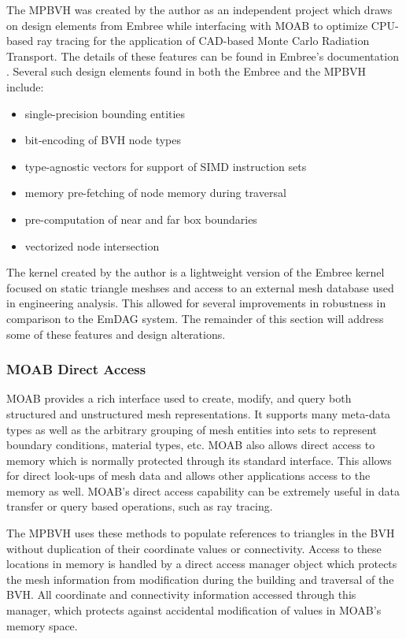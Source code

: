 The MPBVH was created by the author as an independent project which draws on
design elements from Embree while interfacing with MOAB to optimize CPU-based
ray tracing for the application of CAD-based Monte Carlo Radiation
Transport. The details of these features can be found in Embree's documentation
\cite{Embree}. Several such design elements found in both the Embree and the MPBVH
include:

 \begin{itemize} 
  \item single-precision bounding entities
  \item bit-encoding of BVH node types
  \item type-agnostic vectors for support of SIMD instruction sets
  \item memory pre-fetching of node memory during traversal
  \item pre-computation of near and far box boundaries
  \item vectorized node intersection
 \end{itemize} 


The kernel created by the author is a lightweight version of the Embree kernel
focused on static triangle meshses and access to an external mesh database used
in engineering analysis. This allowed for several improvements in robustness in
comparison to the EmDAG system. The remainder of this section will address some
of these features and design alterations.

\subsubsection{MOAB Direct Access}

MOAB provides a rich interface used to create, modify, and query both structured
and unstructured mesh representations. It supports many meta-data types as well
as the arbitrary grouping of mesh entities into sets to represent boundary
conditions, material types, etc. MOAB also allows direct access to memory which
is normally protected through its standard interface. This allows for direct
look-ups of mesh data and allows other applications access to the memory as
well. MOAB's direct access capability can be extremely useful in data transfer
or query based operations, such as ray tracing.

The MPBVH uses these methods to populate references to triangles in the BVH
without duplication of their coordinate values or connectivity. Access to these
locations in memory is handled by a direct access manager object which protects
the mesh information from modification during the building and traversal of the
BVH. All coordinate and connectivity information accessed through this manager,
which protects against accidental modification of values in MOAB's memory space.

